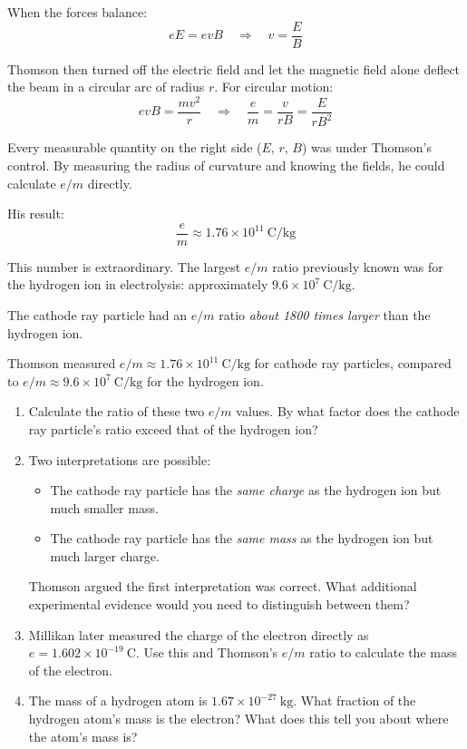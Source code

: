 \documentclass[12pt, a4paper]{book}
\theoremstyle{definition}
\begin{document}
\vspace{0.5em}

When the forces balance:
\[
  eE = evB \quad \Rightarrow \quad v = \frac{E}{B}
\]

Thomson then turned off the electric field and let the magnetic
field alone deflect the beam in a circular arc of radius $r$.
For circular motion:
\[
  evB = \frac{mv^2}{r} \quad \Rightarrow \quad
  \frac{e}{m} = \frac{v}{rB} = \frac{E}{rB^2}
\]

Every measurable quantity on the right side ($E$, $r$, $B$)
was under Thomson's control.
By measuring the radius of curvature and knowing the fields,
he could calculate $e/m$ directly.

His result:
\[
  \frac{e}{m} \approx 1.76 \times 10^{11}\ \si{\coulomb\per\kilogram}
\]

This number is extraordinary.
The largest $e/m$ ratio previously known was for
the hydrogen ion in electrolysis:
approximately $9.6 \times 10^7\ \si{\coulomb\per\kilogram}$.

The cathode ray particle had an $e/m$ ratio
\emph{about 1800 times larger} than the hydrogen ion.

\begin{puzzlebox}
Thomson measured $e/m \approx 1.76 \times 10^{11}\ \si{\coulomb\per\kilogram}$
for cathode ray particles,
compared to $e/m \approx 9.6 \times 10^7\ \si{\coulomb\per\kilogram}$
for the hydrogen ion.

\begin{enumerate}[label=(\alph*), leftmargin=*]
  \item Calculate the ratio of these two $e/m$ values.
        By what factor does the cathode ray particle's ratio
        exceed that of the hydrogen ion?

  \item Two interpretations are possible:
        \begin{itemize}[nosep]
          \item The cathode ray particle has the \emph{same charge}
                as the hydrogen ion but much smaller mass.
          \item The cathode ray particle has the \emph{same mass}
                as the hydrogen ion but much larger charge.
        \end{itemize}
        Thomson argued the first interpretation was correct.
        What additional experimental evidence would you need
        to distinguish between them?

  \item Millikan later measured the charge of the electron
        directly as $e = 1.602 \times 10^{-19}\ \si{\coulomb}$.
        Use this and Thomson's $e/m$ ratio to calculate
        the mass of the electron.

  \item The mass of a hydrogen atom is
        $1.67 \times 10^{-27}\ \si{\kilogram}$.
        What fraction of the hydrogen atom's mass is the electron?
        What does this tell you about where the atom's mass is?
\end{enumerate}
\end{puzzlebox}
\end{document}

